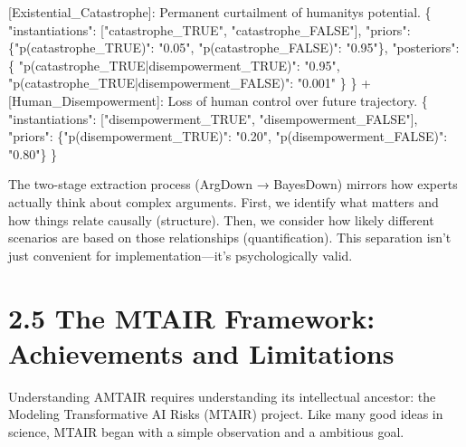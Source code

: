 \documentclass[
  11pt,
  letterpaper,
  openany]{book}
\newenvironment{Shaded}{\begin{snugshade}}{\end{snugshade}}
\newcommand{\DataTypeTok}[1]{\textcolor[rgb]{0.68,0.00,0.00}{#1}}
\newcommand{\ErrorTok}[1]{\textcolor[rgb]{0.68,0.00,0.00}{#1}}
\newcommand{\FunctionTok}[1]{\textcolor[rgb]{0.28,0.35,0.67}{#1}}
\newcommand{\OtherTok}[1]{\textcolor[rgb]{0.00,0.23,0.31}{#1}}
\newcommand{\StringTok}[1]{\textcolor[rgb]{0.13,0.47,0.30}{#1}}
\begin{document}
\begin{Shaded}
\begin{Highlighting}[]
\OtherTok{[}\ErrorTok{Existential\_Catastrophe}\OtherTok{]}\ErrorTok{:} \ErrorTok{Permanent} \ErrorTok{curtailment} \ErrorTok{of} \ErrorTok{humanity\textquotesingle{}s} \ErrorTok{potential.} \FunctionTok{\{}
  \DataTypeTok{"instantiations"}\FunctionTok{:} \OtherTok{[}\StringTok{"catastrophe\_TRUE"}\OtherTok{,} \StringTok{"catastrophe\_FALSE"}\OtherTok{]}\FunctionTok{,}
  \DataTypeTok{"priors"}\FunctionTok{:} \FunctionTok{\{}\DataTypeTok{"p(catastrophe\_TRUE)"}\FunctionTok{:} \StringTok{"0.05"}\FunctionTok{,} \DataTypeTok{"p(catastrophe\_FALSE)"}\FunctionTok{:} \StringTok{"0.95"}\FunctionTok{\},}
  \DataTypeTok{"posteriors"}\FunctionTok{:} \FunctionTok{\{}
    \DataTypeTok{"p(catastrophe\_TRUE|disempowerment\_TRUE)"}\FunctionTok{:} \StringTok{"0.95"}\FunctionTok{,}
    \DataTypeTok{"p(catastrophe\_TRUE|disempowerment\_FALSE)"}\FunctionTok{:} \StringTok{"0.001"}
  \FunctionTok{\}}
\FunctionTok{\}}
 \ErrorTok{+} \OtherTok{[}\ErrorTok{Human\_Disempowerment}\OtherTok{]}\ErrorTok{:} \ErrorTok{Loss} \ErrorTok{of} \ErrorTok{human} \ErrorTok{control} \ErrorTok{over} \ErrorTok{future} \ErrorTok{trajectory.} \FunctionTok{\{}
   \DataTypeTok{"instantiations"}\FunctionTok{:} \OtherTok{[}\StringTok{"disempowerment\_TRUE"}\OtherTok{,} \StringTok{"disempowerment\_FALSE"}\OtherTok{]}\FunctionTok{,}
   \DataTypeTok{"priors"}\FunctionTok{:} \FunctionTok{\{}\DataTypeTok{"p(disempowerment\_TRUE)"}\FunctionTok{:} \StringTok{"0.20"}\FunctionTok{,} \DataTypeTok{"p(disempowerment\_FALSE)"}\FunctionTok{:} \StringTok{"0.80"}\FunctionTok{\}}
 \FunctionTok{\}}
\end{Highlighting}
\end{Shaded}

The two-stage extraction process (ArgDown → BayesDown) mirrors how
experts actually think about complex arguments. First, we identify what
matters and how things relate causally (structure). Then, we consider
how likely different scenarios are based on those relationships
(quantification). This separation isn't just convenient for
implementation---it's psychologically valid.

\section{2.5 The MTAIR Framework: Achievements and
Limitations}\label{sec-mtair-framework}

Understanding AMTAIR requires understanding its intellectual ancestor:
the Modeling Transformative AI Risks (MTAIR) project. Like many good
ideas in science, MTAIR began with a simple observation and a ambitious
goal.
\end{document}
